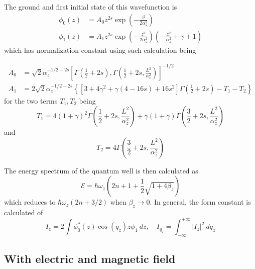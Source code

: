 \documentclass{article}
\begin{document}
The ground and first initial state of this wavefunction is 
\begin{align}
    \phi_{0}(z) & = A_{0}z^{2s}\exp{\left(-\frac{z^{2}}{2\alpha^{2}_{z}}\right)} \\
    \phi_{1}(z) & = A_{1} z^{2s}\exp{\left( -\frac{z^{2}}{2\alpha^{2}_{z}} \right)} \left(-\frac{z^{2}}{\alpha_{z}^{2}}+\gamma + 1\right)
\end{align}
which has normalization constant using such calculation being 

\begin{align}
    A_{0} & = \sqrt{2}\alpha_{z}^{-1/2-2s} \left[\Gamma \left(\frac{1}{2}+2s\right), \Gamma\left(\frac{1}{2}+2s, \frac{L^{2}}{\alpha_{z}^{2}}\right)\right]^{-1/2}\\
    A_{1} & = 2\sqrt{2} \alpha_{z}^{-1/2-2s} \left\{ \left[3+4\gamma^{2}+\gamma(4-16s)+16s^{2}\right] \Gamma\left(\frac{1}{2}+2s\right)- T_{1} - T_{2}\right\}
\end{align}
for the two terms $T_{1},T_{2}$ being
\begin{equation}
    T_{1} = 4(1+\gamma)^{2} \Gamma\left(\frac{1}{2}+2s, \frac{L^{2}}{\alpha_{z}^{2}}\right) + \gamma(1+\gamma) \Gamma \left(\frac{3}{2}+2s, \frac{L^{2}}{\alpha_{z}^{2}}\right)
\end{equation}
and 
\begin{equation}
    T_{2} = 4\Gamma \left(\frac{3}{2}+2s, \frac{L^{2}}{\alpha_{z}^{2}} \right)
\end{equation}

The energy spectrum of the quantum well is then calculated as 
\begin{equation}
    \mathcal{E} = \hbar \omega_{z} \left( 2n+1 + \frac{1}{2}\sqrt{1+4\beta_{z}} \right)
\end{equation}
which reduces to $\hbar\omega_{z}(2n+3/2)$ when $\beta_{z}\to 0$. In general, the form constant is calculated of 
\begin{equation}
    I_{z} = 2\int \phi^{*}_{0}(z)\cos{(q_{z})z}\phi_{1}\:dz, \quad I_{q_{z}} = \int_{-\infty}^{+\infty} \lvert I_{z}\rvert^{2} \: dq_{z}
\end{equation}
\subsection{With electric and magnetic field}
\end{document}
